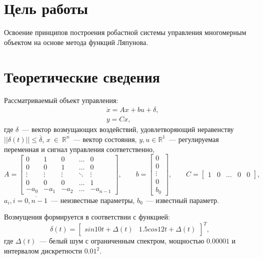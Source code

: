 \section{Цель работы}
Освоение принципов построения робастной системы управления многомерным объектом на основе метода функций Ляпунова.


\section{Теоретические сведения}
Рассматриваемый объект управления:
\begin{equation}
    \begin{aligned}
        & \dot{x} = Ax + bu + \delta, \\
        & y = Cx,
    \end{aligned}
\end{equation}
где $\delta$~--- вектор возмущающих воздействий, удовлетворяющий неравенству $||\delta(t)|| \le \overline{\delta}$, \newline $x~\in~\mathbb{R}^n$~--- вектор состояния, $y, u \in \mathbb{R}^1$~--- регулируемая переменная и сигнал управления соответственно, 
\begin{equation}
    A =
    \begin{bmatrix}
        0 & 1 & 0 & \ldots & 0 \\
        0 & 0 & 1 & \ldots & 0 \\
        \vdots & \vdots & \vdots & \ddots & \vdots \\
        0 & 0 & 0 & \ldots & 1 \\
        -a_0 & -a_1 & -a_2 & \ldots & -a_{n-1}
    \end{bmatrix}\!\!,
    \qquad
    b =
    \begin{bmatrix}
        0 \\ 0 \\ \vdots \\ 0 \\ b_0
    \end{bmatrix}\!\!,
    \qquad
    C =
    \begin{bmatrix}
        1 & 0 & \ldots & 0 & 0
    \end{bmatrix}\!\!,
\end{equation}
$a_i, i=\overline{0, n-1}$~--- неизвестные параметры, $b_0$~--- известный параметр.

Возмущения формируется в соответствии с функцией:
\begin{equation}
	\delta(t) =
	\begin{bmatrix}
	sin 10 t + \Delta(t) & 1.5 cos 12 t + \Delta(t)
	\end{bmatrix}^T,
\end{equation}
где $\Delta(t)$~--- белый шум с ограниченным спектром, мощностью $0.00001$ и интервалом дискретности $0.01^2$.

